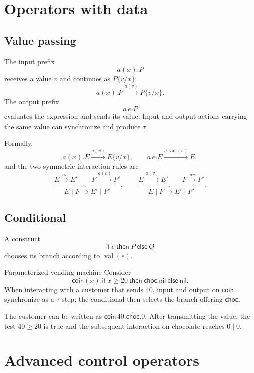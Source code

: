 \documentclass[a4paper]{article}
\newcommand{\nil}{\mathsf{nil}}
\newcommand{\trans}[1]{\xrightarrow{#1}}
\begin{document}
\section{Operators with data}

\subsection{Value passing}

The input prefix
\[
    a(x).P
\]
receives a value \(v\) and continues as \(P\{v/x\}\):
\[
    a(x).P\trans{a(v)}P\{v/x\}.
\]
The output prefix
\[
    \overline a\,e.P
\]
evaluates the expression and sends its value.
Input and output actions carrying the same value can synchronize and produce \(\tau\).

Formally,
\[
    a(x).E\trans{a(v)}E\{v/x\},
    \qquad
    \overline a\,e.E\trans{\overline a\,\operatorname{val}(e)}E,
\]
and the two symmetric interaction rules are
\[
    \frac{E\trans{\overline a v}E'\qquad F\trans{a(v)}F'}{E\mid F\trans{\tau}E'\mid F'},
    \qquad
    \frac{E\trans{a(v)}E'\qquad F\trans{\overline a v}F'}{E\mid F\trans{\tau}E'\mid F'}.
\]

\subsection{Conditional}

A construct
\[
    \mathsf{if}\ e\ \mathsf{then}\ P\ \mathsf{else}\ Q
\]
chooses its branch according to \(\operatorname{val}(e)\).

\begin{snippetexample}{Parameterized vending machine}
    Consider
    \[
        \mathsf{coin}(x).
        \mathsf{if}\ x\geq20\ \mathsf{then}\ \mathsf{choc}.\nil\ \mathsf{else}\ \nil.
    \]
    When interacting with a customer that sends \(40\), input and output on \(\mathsf{coin}\) synchronize as a \(\tau\)-step; the conditional then selects the branch offering \(\mathsf{choc}\).
\end{snippetexample}

The customer can be written as \(\overline{\mathsf{coin}}\,40.\overline{\mathsf{choc}}.0\). After transmitting the value, the test \(40\geq20\) is true and the subsequent interaction on chocolate reaches \(0\mid0\).

\section{Advanced control operators}
\end{document}
